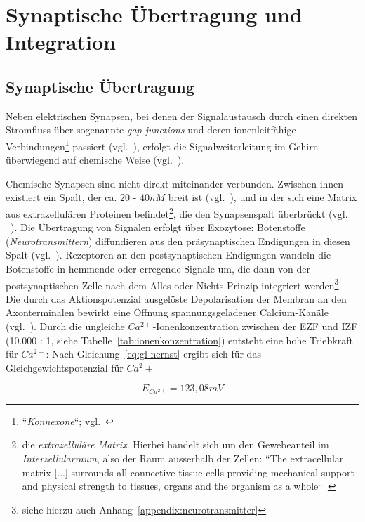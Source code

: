 {\section{Synaptische Übertragung und Integration}


\subsection{Synaptische Übertragung}\label{sec:synaptischeuebertragung}
Neben elektrischen Synapsen, bei denen der Signalaustausch durch einen direkten Stromfluss über sogenannte \textit{gap junctions} und deren ionenleitfähige Verbindungen\footnote{
 ``\textit{Konnexone}``; vgl.~\cite[50]{SD07}
} passiert (vgl.~\cite[119]{BCP18}), erfolgt die Signalweiterleitung im Gehirn überwiegend auf chemische Weise (vgl.~\cite[121 ff.]{BCP18}).

Chemische Synapsen sind nicht direkt miteinander verbunden. 
Zwischen ihnen existiert ein Spalt, der ca. $20$ - $40 nM$ breit ist (vgl.~\cite[184]{KSJ+13}), und in der sich eine Matrix aus extrazellulären Proteinen befindet\footnote{
 die \textit{extrazelluläre Matrix}. Hierbei handelt sich um den Gewebeanteil im \textit{Interzellularraum}, also der Raum ausserhalb der Zellen: ``The extracellular matrix {[...]} surrounds all connective tissue cells providing mechanical support and physical strength to tissues, organs and the organism as a whole``~\cite[3]{AHH+98}
}, die den Synapsenspalt überbrückt (vgl. ~\cite[122]{BCP18}).
Die Übertragung von Signalen erfolgt über Exozytose: Botenstoffe (\textit{Neurotransmittern}) diffundieren aus den präsynaptischen Endigungen in diesen Spalt (vgl.~\cite[122]{BCP18}). Rezeptoren an den postsynaptischen Endigungen wandeln die Botenstoffe in hemmende oder erregende Signale um, die dann von der postsynaptischen Zelle nach dem Alles-oder-Nichts-Prinzip integriert werden\footnote{siehe hierzu auch Anhang~\ref{appendix:neurotransmitter}}.\\

Die durch das Aktionspotenzial ausgelöste Depolarisation der Membran an den Axonterminalen bewirkt eine Öffnung spannungsgeladener Calcium-Kanäle (vgl.~\cite[184]{KSJ+13}).
Durch die ungleiche $Ca^{2+}$-Ionenkonzentration zwischen der EZF und IZF (10.000 : 1, siehe Tabelle~\ref{tab:ionenkonzentration}) entsteht eine hohe Triebkraft für $Ca^{2+}$: Nach Gleichung~\ref{eq:gl-nernst} ergibt sich für das Gleichgewichtspotenzial für $Ca^2+$

\begin{equation}
 E_{Ca^{2+}} = 123,08 mV
 \label{eq:gl-eqca2}
\end{equation}


}
